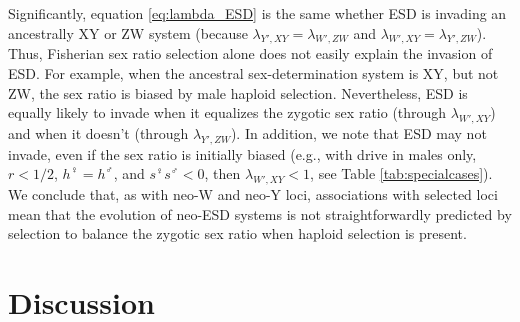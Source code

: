 \documentclass[10pt,letterpaper]{article}
\begin{document}

Significantly, equation \eqref{eq:lambda_ESD} is the same whether ESD is invading an ancestrally XY or ZW system (because $\lambda_{Y',XY} = \lambda_{W',ZW}$ and $\lambda_{W',XY} = \lambda_{Y',ZW}$).
Thus, Fisherian sex ratio selection alone does not easily explain the invasion of ESD.
For example, when the ancestral sex-determination system is XY, but not ZW, the sex ratio is biased by male haploid selection.
Nevertheless, ESD is equally likely to invade when it equalizes the zygotic sex ratio (through $\lambda_{W',XY}$) and when it doesn't (through $\lambda_{Y',ZW}$). 
In addition, we note that ESD may not invade, even if the sex ratio is initially biased (e.g., with drive in males only, $r<1/2$, $h^\female=h^\male$, and $s^\female s^\male<0$, then $\lambda_{W',XY}<1$, see Table \ref{tab:specialcases}). 
We conclude that, as with neo-W and neo-Y loci, associations with selected loci mean that the evolution of neo-ESD systems is not straightforwardly predicted by selection to balance the zygotic sex ratio when haploid selection is present. 

\section*{Discussion}

\end{document}
